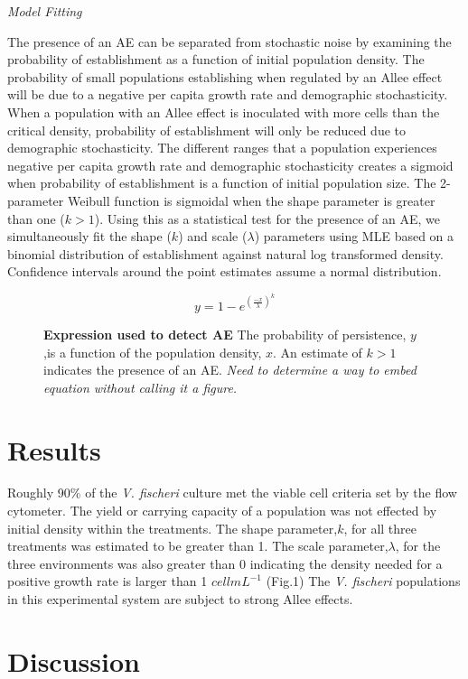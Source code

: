 \documentclass[a4paper,10pt]{article}\usepackage[]{graphicx}\usepackage[]{color}
\begin{document}
\textit{Model Fitting}

The presence of an AE can be separated from stochastic noise by examining the probability of establishment as a function of initial population density. The probability of small populations establishing when regulated by an Allee effect will be due to a negative per capita growth rate and demographic stochasticity. When a population with an Allee effect is inoculated with more cells than the critical density, probability of establishment will only be reduced due to demographic stochasticity. The different ranges that a population experiences negative per capita growth rate and demographic stochasticity creates a sigmoid when probability of establishment is a function of initial population size. The 2-parameter Weibull function is sigmoidal when the shape parameter is greater than one ($k>1$). Using this as a statistical test for the presence of an AE, we simultaneously fit the shape ($k$) and scale ($\lambda$) parameters using MLE based on a binomial distribution of establishment against natural log transformed density. Confidence intervals around the point estimates assume a normal distribution. 


\begin{figure}
\[ y = 1-e^{(\frac{-x}{\lambda})^{k}} \]
\caption{\textbf{Expression used to detect AE} The probability of persistence, $y$,is a function of the population density, $x$. An estimate of $k>1$ indicates the presence of an AE. \textit{Need to determine a way to embed equation without calling it a figure.}}
\end{figure}

\section{Results}

Roughly 90\% of the \textit{V. fischeri} culture met the viable cell criteria set by the flow cytometer. The yield or carrying capacity of a population was not effected by initial density within the treatments. The shape parameter,$k$, for all three treatments was estimated to be greater than 1. The scale parameter,$\lambda$, for the three environments was also greater than 0 indicating the density needed for a positive growth rate is larger than 1 $cell mL^{-1}$ (Fig.1) The \textit{V. fischeri} populations in this experimental system are subject to strong Allee effects. 
   
\section{Discussion}
\end{document}
